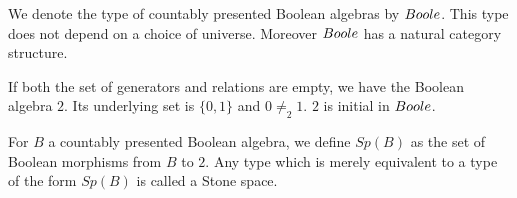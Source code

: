 \begin{remark}
  We denote the type of countably presented Boolean algebras by $\Boole$. 
  This type does not depend on a choice of universe. 
  Moreover $\Boole$ has a natural category structure. 
\end{remark}

\begin{example}
  If both the set of generators and relations are empty, we have the Boolean algebra $2$.
  Its underlying set is $\{0,1\}$ and $0\neq_2 1$.
  $2$ is initial in $\Boole$. 
\end{example}
%
\begin{definition}
  For $B$ a countably presented Boolean algebra, 
  we define $Sp(B)$ as the set of Boolean morphisms from $B$ to $2$.
  Any type which is merely equivalent to a type of the form $Sp(B)$ is called a Stone space.
\end{definition}

